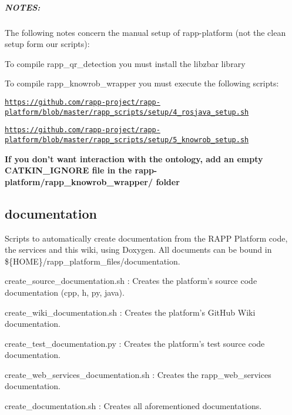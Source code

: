 \subparagraph*{N\-O\-T\-E\-S\-:}

The following notes concern the manual setup of rapp-\/platform (not the clean setup form our scripts)\-:


\begin{DoxyItemize}
\item To compile {\ttfamily rapp\-\_\-qr\-\_\-detection} you must install the {\ttfamily libzbar} library
\item To compile {\ttfamily rapp\-\_\-knowrob\-\_\-wrapper} you must execute the following scripts\-:
\begin{DoxyItemize}
\item \href{https://github.com/rapp-project/rapp-platform/blob/master/rapp_scripts/setup/4_rosjava_setup.sh}{\tt https\-://github.\-com/rapp-\/project/rapp-\/platform/blob/master/rapp\-\_\-scripts/setup/4\-\_\-rosjava\-\_\-setup.\-sh}
\item \href{https://github.com/rapp-project/rapp-platform/blob/master/rapp_scripts/setup/5_knowrob_setup.sh}{\tt https\-://github.\-com/rapp-\/project/rapp-\/platform/blob/master/rapp\-\_\-scripts/setup/5\-\_\-knowrob\-\_\-setup.\-sh}
\item {\bfseries If you don't want interaction with the ontology, add an empty {\ttfamily C\-A\-T\-K\-I\-N\-\_\-\-I\-G\-N\-O\-R\-E} file in the {\ttfamily rapp-\/platform/rapp\-\_\-knowrob\-\_\-wrapper/} folder}
\end{DoxyItemize}
\end{DoxyItemize}

\subsection*{documentation}

Scripts to automatically create documentation from the R\-A\-P\-P Platform code, the services and this wiki, using Doxygen. All documents can be bound in {\ttfamily \$\{H\-O\-M\-E\}/rapp\-\_\-platform\-\_\-files/documentation}.


\begin{DoxyItemize}
\item {\ttfamily create\-\_\-source\-\_\-documentation.\-sh} \-: Creates the platform's source code documentation (cpp, h, py, java).
\item {\ttfamily create\-\_\-wiki\-\_\-documentation.\-sh} \-: Creates the platform's Git\-Hub Wiki documentation.
\item {\ttfamily create\-\_\-test\-\_\-documentation.\-py} \-: Creates the platform's test source code documentation.
\item {\ttfamily create\-\_\-web\-\_\-services\-\_\-documentation.\-sh} \-: Creates the rapp\-\_\-web\-\_\-services documentation.
\item {\ttfamily create\-\_\-documentation.\-sh} \-: Creates all aforementioned documentations. 
\end{DoxyItemize}